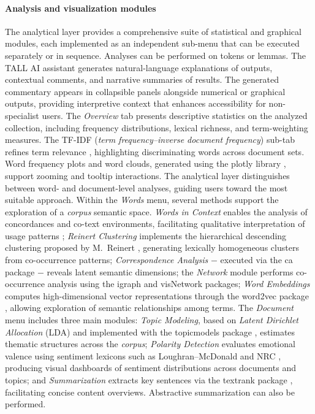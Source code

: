 \documentclass[preprint,12pt,a4paper]{elsarticle}
\begin{document}
\paragraph{Analysis and visualization modules}
The analytical layer provides a comprehensive suite of statistical and graphical modules, each implemented as an independent sub-menu that can be executed separately or in sequence. Analyses can be performed on tokens or lemmas. The TALL AI assistant generates natural-language explanations of outputs, contextual comments, and narrative summaries of results. The generated commentary appears in collapsible panels alongside numerical or graphical outputs, providing interpretive context that enhances accessibility for non-specialist users. The \textit{Overview} tab presents descriptive statistics on the analyzed collection, including frequency distributions, lexical richness, and term-weighting measures. The TF-IDF (\textit{term frequency–inverse document frequency}) sub-tab refines term relevance \cite{sal88}, highlighting discriminating words across document sets. Word frequency plots and word clouds, generated using the \textsf{plotly} library \cite{sie20}, support zooming and tooltip interactions. The analytical layer distinguishes between word- and document-level analyses, guiding users toward the most suitable approach. Within the \textit{Words} menu, several methods support the exploration of a \textit{corpus} semantic space. \textit{Words in Context} enables the analysis of concordances and co-text environments, facilitating qualitative interpretation of usage patterns \cite{wul20}; \textit{Reinert Clustering} implements the hierarchical descending clustering proposed by M.~Reinert \cite{rei83}, generating lexically homogeneous clusters from co-occurrence patterns; \textit{Correspondence Analysis} $-$ executed via the \textsf{ca} package \cite{nen07} $-$ reveals latent semantic dimensions; the \textit{Network} module performs co-occurrence analysis using the \textsf{igraph} \cite{csa06} and \textsf{visNetwork} \cite{alm25} packages; \textit{Word Embeddings} computes high-dimensional vector representations through the \textsf{word2vec} package \cite{wij23}, allowing exploration of semantic relationships among terms. The \textit{Document} menu includes three main modules: \textit{Topic Modeling}, based on \textit{Latent Dirichlet Allocation} (LDA) \cite{ble03} and implemented with the \textsf{topicmodels} package \cite{gru11}, estimates thematic structures across the \textit{corpus}; \textit{Polarity Detection} evaluates emotional valence using sentiment lexicons such as Loughran–McDonald \cite{lou16} and NRC \cite{moh13}, producing visual dashboards of sentiment distributions across documents and topics; and \textit{Summarization} extracts key sentences via the \textsf{textrank} package \cite{wij20}, facilitating concise content overviews. Abstractive summarization can also be performed.
\end{document}
